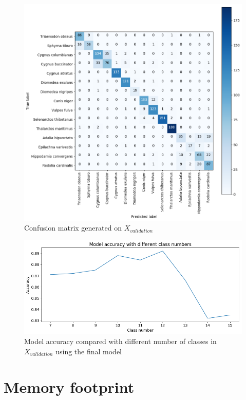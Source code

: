 \documentclass[times, utf8, diplomski]{fer}
\begin{document}
\begin{figure}
  \includegraphics[scale=0.66]{figures/confusion_matrix.png}
  \centering
  \caption{Confusion matrix generated on $X_{validation}$}
  \label{fig:species_confusion_matrix}
\end{figure}

\begin{figure}
  \includegraphics[scale=0.59]{figures/model_acc_class_num.png}
  \centering
  \caption{Model accuracy compared with different number of classes in $X_{validation}$ using the final model}
  \label{fig:model_acc_class_num}
\end{figure}


\section{Memory footprint}
\end{document}
